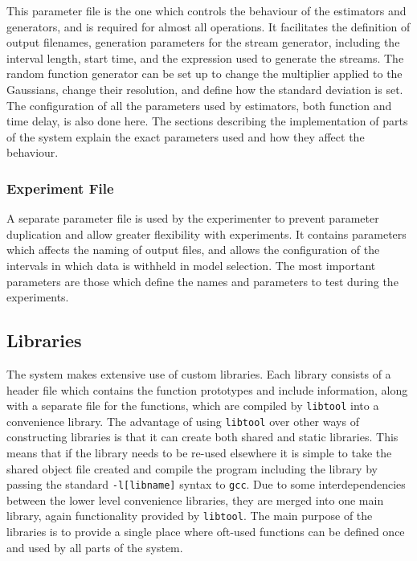 \documentclass[a4paper,11pt,twoside]{article}
\begin{document}
    This parameter file is the one which controls the behaviour of the
    estimators and generators, and is required for almost all operations. It
    facilitates the definition of output filenames, generation parameters for
    the stream generator, including the interval length, start time, and the
    expression used to generate the streams. The random function generator can
    be set up to change the multiplier applied to the Gaussians, change their
    resolution, and define how the standard deviation is set. The configuration
    of all the parameters used by estimators, both function and time delay, is
    also done here. The sections describing the implementation of parts of the
    system explain the exact parameters used and how they affect the behaviour.
\subsubsection{Experiment File}
\label{sec-6-2-2}

    A separate parameter file is used by the experimenter to prevent parameter
    duplication and allow greater flexibility with experiments. It contains
    parameters which affects the naming of output files, and allows the
    configuration of the intervals in which data is withheld in model
    selection. The most important parameters are those which define the names
    and parameters to test during the experiments.
\subsection{Libraries}
\label{sec-6-3}

   The system makes extensive use of custom libraries. Each library consists of
   a header file which contains the function prototypes and include information,
   along with a separate file for the functions, which are compiled by
   \texttt{libtool} into a convenience library. The advantage of using
   \texttt{libtool} over other ways of constructing libraries is that it can
   create both shared and static libraries. This means that if the library needs
   to be re-used elsewhere it is simple to take the shared object file created
   and compile the program including the library by passing the standard
   \texttt{-l[libname]} syntax to \texttt{gcc}. Due to some interdependencies
   between the lower level convenience libraries, they are merged into one main
   library, again functionality provided by \texttt{libtool}. The main purpose
   of the libraries is to provide a single place where oft-used functions can be
   defined once and used by all parts of the system.
\end{document}
